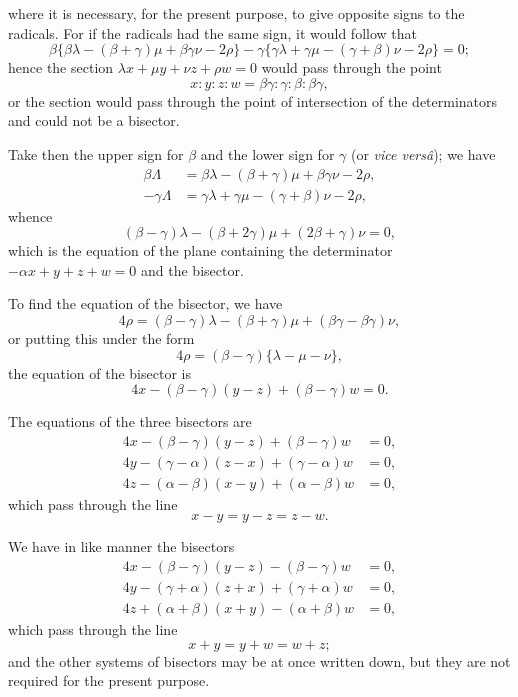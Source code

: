 \documentclass[11pt]{article}
\begin{document}
\newpage
\setcounter{page}{62}

where it is necessary, for the present purpose, to give opposite signs to the radicals. For if the radicals had the same sign, it would follow that
\[
\beta\{\beta\lambda-(\beta+\gamma)\mu+\beta\gamma\nu-2\rho\} - \gamma\{\gamma\lambda+\gamma\mu-(\gamma+\beta)\nu-2\rho\} = 0;
\]
hence the section $\lambda x + \mu y + \nu z + \rho w = 0$ would pass through the point
\[
x:y:z:w = \beta\gamma : \gamma : \beta : \beta\gamma,
\]
or the section would pass through the point of intersection of the determinators and could not be a bisector.

Take then the upper sign for $\beta$ and the lower sign for $\gamma$ (or \textit{vice vers\^a}); we have
\begin{align*}
\beta\Lambda &= \beta\lambda - (\beta+\gamma)\mu + \beta\gamma\nu - 2\rho,\\
-\gamma\Lambda &= \gamma\lambda + \gamma\mu - (\gamma+\beta)\nu - 2\rho,
\end{align*}
whence
\[
(\beta-\gamma)\lambda - (\beta+2\gamma)\mu + (2\beta+\gamma)\nu = 0,
\]
which is the equation of the plane containing the determinator $-\alpha x+y+z+w=0$ and the bisector.

To find the equation of the bisector, we have
\[
4\rho = (\beta-\gamma)\lambda - (\beta+\gamma)\mu + (\beta\gamma-\beta\gamma)\nu,
\]
or putting this under the form
\[
4\rho = (\beta-\gamma)\{\lambda - \mu - \nu\},
\]
the equation of the bisector is
\[
4x - (\beta-\gamma)(y-z) + (\beta-\gamma)w = 0.
\]

The equations of the three bisectors are
\begin{align*}
4x - (\beta-\gamma)(y-z) + (\beta-\gamma)w &= 0,\\
4y - (\gamma-\alpha)(z-x) + (\gamma-\alpha)w &= 0,\\
4z - (\alpha-\beta)(x-y) + (\alpha-\beta)w &= 0,
\end{align*}
which pass through the line
\[
x-y = y-z = z-w.
\]

\newpage
\setcounter{page}{63}

We have in like manner the bisectors
\begin{align*}
4x - (\beta-\gamma)(y-z) - (\beta-\gamma)w &= 0,\\
4y - (\gamma+\alpha)(z+x) + (\gamma+\alpha)w &= 0,\\
4z + (\alpha+\beta)(x+y) - (\alpha+\beta)w &= 0,
\end{align*}
which pass through the line
\[
x+y = y+w = w+z;
\]
and the other systems of bisectors may be at once written down, but they are not required for the present purpose.
\end{document}
